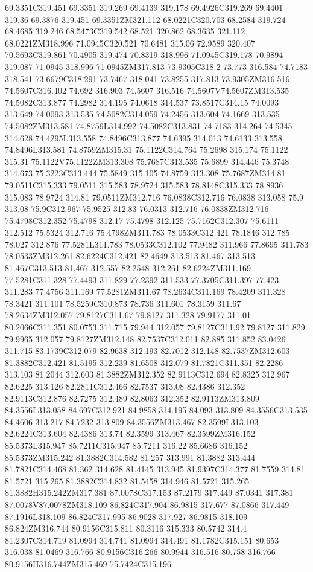 69.3351C319.451 69.3351 319.269 69.4139 319.178 69.4926C319.269 69.4401 319.36 69.3876 319.451 69.3351ZM321.112 68.0221C320.703 68.2584 319.724 68.4685 319.246 68.5473C319.542 68.521 320.862 68.3635 321.112 68.0221ZM318.996 71.0945C320.521 70.6481 315.06 72.9589 320.407 70.5693C319.861 70.4905 319.474 70.8319 318.996 71.0945C319.178 70.9894 319.087 71.0945 318.996 71.0945ZM317.813 73.9305C318.2 73.773 316.584 74.7183 318.541 73.6679C318.291 73.7467 318.041 73.8255 317.813 73.9305ZM316.516 74.5607C316.402 74.692 316.903 74.5607 316.516 74.5607V74.5607ZM313.535 74.5082C313.877 74.2982 314.195 74.0618 314.537 73.8517C314.15 74.0093 313.649 74.0093 313.535 74.5082C314.059 74.2456 313.604 74.1669 313.535 74.5082ZM313.581 74.8759L314.992 74.5082C313.831 74.7183 314.264 74.5345 314.628 74.4295L313.558 74.8496C313.877 74.6395 314.013 74.6133 313.558 74.8496L313.581 74.8759ZM315.31 75.1122C314.764 75.2698 315.174 75.1122 315.31 75.1122V75.1122ZM313.308 75.7687C313.535 75.6899 314.446 75.3748 314.673 75.3223C313.444 75.5849 315.105 74.8759 313.308 75.7687ZM314.81 79.0511C315.333 79.0511 315.583 78.9724 315.583 78.8148C315.333 78.8936 315.083 78.9724 314.81 79.0511ZM312.716 76.0838C312.716 76.0838 313.058 75.9 313.08 75.9C312.967 75.9525 312.83 76.0313 312.716 76.0838ZM312.716 75.4798C312.352 75.4798 312.17 75.4798 312.125 75.7162C312.307 75.6111 312.512 75.5324 312.716 75.4798ZM311.783 78.0533C312.421 78.1846 312.785 78.027 312.876 77.5281L311.783 78.0533C312.102 77.9482 311.966 77.8695 311.783 78.0533ZM312.261 82.6224C312.421 82.4649 313.513 81.467 313.513 81.467C313.513 81.467 312.557 82.2548 312.261 82.6224ZM311.169 77.5281C311.328 77.4493 311.829 77.2392 311.533 77.3705C311.397 77.423 311.283 77.4756 311.169 77.5281ZM311.67 78.2634C311.169 78.4209 311.328 78.3421 311.101 78.5259C310.873 78.736 311.601 78.3159 311.67 78.2634ZM312.057 79.8127C311.67 79.8127 311.328 79.9177 311.01 80.2066C311.351 80.0753 311.715 79.944 312.057 79.8127C311.92 79.8127 311.829 79.9965 312.057 79.8127ZM312.148 82.7537C312.011 82.885 311.852 83.0426 311.715 83.1739C312.079 82.9638 312.193 82.7012 312.148 82.7537ZM312.603 81.3882C312.421 81.5195 312.239 81.6508 312.079 81.7821C311.351 82.2286 313.103 81.2044 312.603 81.3882ZM312.352 82.9113C312.694 82.8325 312.967 82.6225 313.126 82.2811C312.466 82.7537 313.08 82.4386 312.352 82.9113C312.876 82.7275 312.489 82.8063 312.352 82.9113ZM313.809 84.3556L313.058 84.697C312.921 84.9858 314.195 84.093 313.809 84.3556C313.535 84.4606 313.217 84.7232 313.809 84.3556ZM313.467 82.3599L313.103 82.6224C313.604 82.4386 313.74 82.3599 313.467 82.3599ZM316.152 85.5373L315.947 85.7211C315.947 85.7211 316.22 85.6686 316.152 85.5373ZM315.242 81.3882C314.582 81.257 313.991 81.3882 313.444 81.7821C314.468 81.362 314.628 81.4145 313.945 81.9397C314.377 81.7559 314.81 81.5721 315.265 81.3882C314.832 81.5458 314.946 81.5721 315.265 81.3882H315.242ZM317.381 87.0078C317.153 87.2179 317.449 87.0341 317.381 87.0078V87.0078ZM318.109 86.824C317.904 86.9815 317.677 87.0866 317.449 87.1916L318.109 86.824C317.995 86.9028 317.927 86.9815 318.109 86.824ZM316.744 80.9156C315.811 80.3116 315.333 80.5742 314.4 81.2307C314.719 81.0994 314.741 81.0994 314.491 81.1782C315.151 80.653 316.038 81.0469 316.766 80.9156C316.266 80.9944 316.516 80.758 316.766 80.9156H316.744ZM315.469 75.7424C315.196 